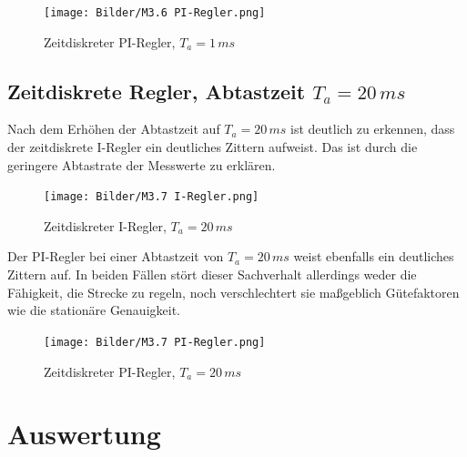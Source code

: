 \documentclass{report}
\begin{document}
        \begin{figure}[!arbit            \centering
            \texttt{[image: Bilder/M3.6 I-Regler.png]}
            \caption{Zeitdiskreter I-Regler, $T_a=1\,ms$}
            \label{fig:m36iregler}
        \end{figure}

Auch der zeitdiskrete PI-Regler bei einer Abtastzeit von $T_a=1\,ms$ ist dem quasi-stetigen PI-Regler sehr ähnlich. Der Graph ist glatt und weist kaum Artefakte auf.

         \begin{figure}[!ht]
            \centering
            \texttt{[image: Bilder/M3.6 PI-Regler.png]}
            \caption{Zeitdiskreter PI-Regler, $T_a=1\,ms$}
            \label{fig:m36piregler}
        \end{figure}


\subsection{Zeitdiskrete Regler, Abtastzeit $T_a=20\,ms$}

Nach dem Erhöhen der Abtastzeit auf $T_{a} = 20\,ms$ ist deutlich zu erkennen, dass der zeitdiskrete I-Regler ein deutliches Zittern aufweist. Das ist durch die geringere Abtastrate der Messwerte zu erklären.

        \begin{figure}[!ht]
            \centering
            \texttt{[image: Bilder/M3.7 I-Regler.png]}
            \caption{Zeitdiskreter I-Regler, $T_a=20\,ms$}
            \label{fig:M3.7 I-Regler png}
        \end{figure}

Der PI-Regler bei einer Abtastzeit von $T_a=20\,ms$ weist ebenfalls ein deutliches Zittern auf. In beiden Fällen stört dieser Sachverhalt allerdings weder die Fähigkeit, die Strecke zu regeln, noch verschlechtert sie maßgeblich Gütefaktoren wie die stationäre Genauigkeit.

        \begin{figure}[!ht]
            \centering
            \texttt{[image: Bilder/M3.7 PI-Regler.png]}
            \caption{Zeitdiskreter PI-Regler, $T_a=20\,ms$}
            \label{fig:M3.7 PI-Regler png}
        \end{figure}



\newpage

\section{Auswertung}
\end{document}
